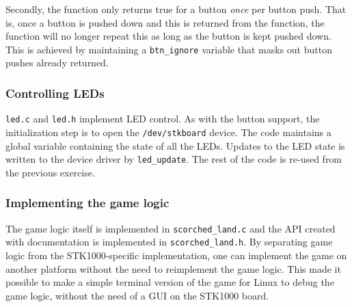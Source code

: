 Secondly, the function only returns true for a button \emph{once} per
button push. That is, once a button is pushed down and this is returned
from the function, the function will no longer repeat this as long as
the button is kept pushed down. This is achieved by maintaining a
\texttt{btn\_ignore} variable that masks out button pushes already
returned.



\subsubsection{Controlling LEDs}

\texttt{led.c} and \texttt{led.h} implement LED control. As with the
button support, the initialization step is to open the
\texttt{/dev/stkboard} device. The code maintains a global variable
containing the state of all the LEDs. Updates to the LED state is
written to the device driver by \texttt{led\_update}. The rest of the
code is re-used from the previous exercise.

\subsubsection{Implementing the game logic}
\label{subsec:game-logic}

The game logic itself is implemented in \texttt{scorched\_land.c} and
the API created with documentation is implemented in
\texttt{scorched\_land.h}. By separating game logic from the
STK1000-specific implementation, one can implement the game on another
platform without the need to reimplement the game logic. This made it
possible to make a simple terminal version of the game for Linux to
debug the game logic, without the need of a GUI on the STK1000 board. 

